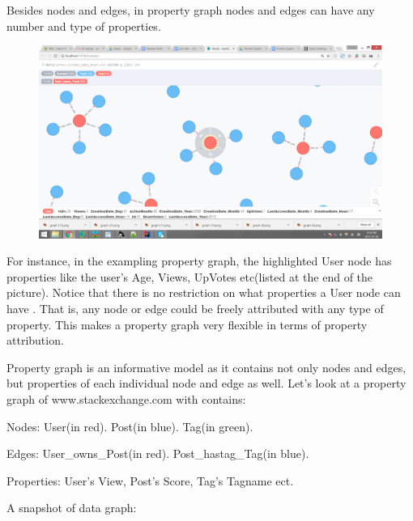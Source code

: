 Besides nodes and edges, in property graph nodes and edges can have any number and type of properties. 


\begin {figure}[H]
\centering
\includegraphics[scale=0.2]{pic/2.png}
\end{figure}

For instance, in the exampling property graph, the highlighted User node has properties like the user’s Age, Views, UpVotes etc(listed at the end of the picture). Notice that there is no restriction on what properties a User node can have . That is, any node or edge could be freely attributed with any type of property. This makes a property graph very flexible in terms of property attribution.
 
Property graph is an informative model as it contains not only nodes and edges, but properties of each individual node and edge as well. Let’s look at a property graph of www.stackexchange.com with contains:

Nodes:	User(in red).
Post(in blue). 
Tag(in green). 
 
Edges: 		User\_owns\_Post(in red). 
Post\_hastag\_Tag(in blue).
 
Properties:	User’s View, Post’s Score, Tag’s Tagname ect.
 
A snapshot of data graph: 

